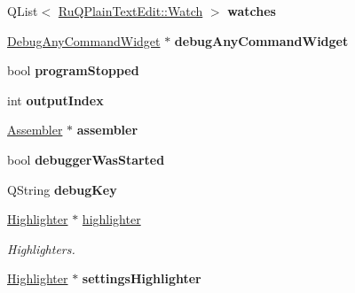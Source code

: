 \begin{DoxyCompactItemize}
\item 
\hypertarget{class_main_window_ad9e9b1792aeba47a7bb27f954dd5f95b}{}Q\+List$<$ \hyperlink{struct_ru_q_plain_text_edit_1_1_watch}{Ru\+Q\+Plain\+Text\+Edit\+::\+Watch} $>$ {\bfseries watches}\label{class_main_window_ad9e9b1792aeba47a7bb27f954dd5f95b}

\item 
\hypertarget{class_main_window_ab5c1ce4f3d677eaa17ada4ec162aec06}{}\hyperlink{class_debug_any_command_widget}{Debug\+Any\+Command\+Widget} $\ast$ {\bfseries debug\+Any\+Command\+Widget}\label{class_main_window_ab5c1ce4f3d677eaa17ada4ec162aec06}

\item 
\hypertarget{class_main_window_a5f3369b552ea5be75a14592ec73d2018}{}bool {\bfseries program\+Stopped}\label{class_main_window_a5f3369b552ea5be75a14592ec73d2018}

\item 
\hypertarget{class_main_window_ae71b480c580e95196e0541d091b29440}{}int {\bfseries output\+Index}\label{class_main_window_ae71b480c580e95196e0541d091b29440}

\item 
\hypertarget{class_main_window_adadee554364d68c67e145995bb0d6d88}{}\hyperlink{class_assembler}{Assembler} $\ast$ {\bfseries assembler}\label{class_main_window_adadee554364d68c67e145995bb0d6d88}

\item 
\hypertarget{class_main_window_a946e1a48859b30089dd5bfcfb2032ef9}{}bool {\bfseries debugger\+Was\+Started}\label{class_main_window_a946e1a48859b30089dd5bfcfb2032ef9}

\item 
\hypertarget{class_main_window_a101e50e1127fe118c8072fb654d2a6f4}{}Q\+String {\bfseries debug\+Key}\label{class_main_window_a101e50e1127fe118c8072fb654d2a6f4}

\item 
\hypertarget{class_main_window_ae653e799d7c4b702ad23f9a5f5b134e7}{}\hyperlink{class_highlighter}{Highlighter} $\ast$ \hyperlink{class_main_window_ae653e799d7c4b702ad23f9a5f5b134e7}{highlighter}\label{class_main_window_ae653e799d7c4b702ad23f9a5f5b134e7}

\begin{DoxyCompactList}\small\item\em Highlighters. \end{DoxyCompactList}\item 
\hypertarget{class_main_window_ac3ed715255e638544c915d3f5dcd0eed}{}\hyperlink{class_highlighter}{Highlighter} $\ast$ {\bfseries settings\+Highlighter}\label{class_main_window_ac3ed715255e638544c915d3f5dcd0eed}


\end{DoxyCompactItemize}
